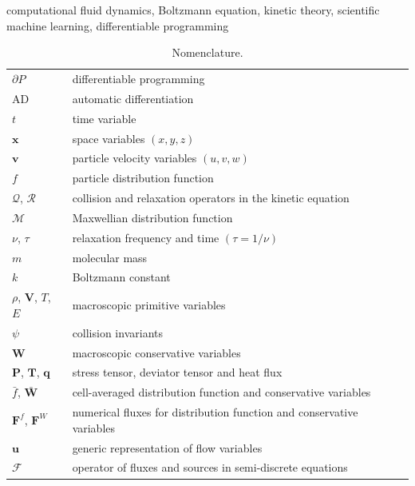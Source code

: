 \documentclass[preprint,3p,12pt,sort&compress]{elsarticle}
\begin{document}
\begin{keyword}
    computational fluid dynamics, Boltzmann equation, kinetic theory, scientific machine learning, differentiable programming
\end{keyword}

\maketitle

\begin{table}
    \centering
    \caption{Nomenclature.}
    \begin{tabular*}{16cm}{lll}
        \hline
        $\partial P$ & differentiable programming \\
        AD & automatic differentiation \\
        $t$ & time variable \\
        $\mathbf x$ & space variables $(x,y,z)$ \\
        $\mathbf v$ & particle velocity variables $(u,v,w)$ \\
        $f$ & particle distribution function \\
        $\mathcal Q$, $\mathcal R$ & collision and relaxation operators in the kinetic equation \\
        $\mathcal M$ & Maxwellian distribution function \\
        $\nu$, $\tau$ & relaxation frequency and time $(\tau=1/\nu)$ \\
        $m$ & molecular mass \\
        $k$ & Boltzmann constant \\
        $\rho$, $\mathbf V$, $T$, $E$ & macroscopic primitive variables \\
        $\psi$ & collision invariants \\
        $\mathbf W$ & macroscopic conservative variables \\
        $\mathbf P$, $\mathbf T$, $\mathbf q$ & stress tensor, deviator tensor and heat flux \\
        $\bar f$, $\bar{\mathbf W}$ & cell-averaged distribution function and conservative variables \\
        $\mathbf F^f$, $\mathbf F^W$ & numerical fluxes for distribution function and conservative variables \\
        $\mathbf u$ & generic representation of flow variables \\
        $\mathcal F$ & operator of fluxes and sources in semi-discrete equations \\

\end{tabular*}
\end{table}
\end{document}
